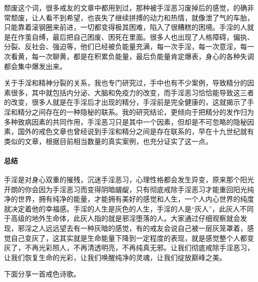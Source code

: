 颓废这个词，很多戒友的文章中都用到过，那种被手淫恶习废掉后的感觉，的确非常颓废，让人看不到希望，也丧失了继续拼搏的动力和热情，就像泄了气的车胎，只能靠着滚钢圈来前进，一切都变得极其困难，陷入了很糟糕的困境。手淫的人就是在作茧自缚，最后把自己困废、困死在里面。很多人也出现了人格障碍，偏执、分裂、反社会、强迫等，他们已经被负能量充满，每一次手淫，每一次意淫，每一次看黄，每一次聊黄，都是在积累负能量，最后负能量肯定爆表，身心的各种失调都会集中爆发出来。

关于手淫和精神分裂的关系，我也专门研究过，手中也有不少案例，导致精分的因素很多，其中就包括内分泌、大脑和免疫力的改变，而手淫恶习恰恰能导致这三者的改变，很多人就是在手淫后才出现的精分，手淫前是完全健康的，这就揭示了手淫和精分之间存在的一种隐秘的联系。我的研究结论，更倾向于把精分的发作归为多种致病因素的共同作用，手淫恶习只是其中一个因素，但却是不可忽略的隐秘因素，国外的戒色文章也曾经说到手淫和精分之间是存在联系的，早在十九世纪就有类似的文章，根据目前相当数量的真实案例，也充分证实了这一点。

\paragraph*{总结}

手淫是对身心双重的摧残，沉迷手淫恶习，心理性格都会发生异变，原来那个阳光开朗的你会因为手淫恶习而变得阴暗龌龊，只有彻底戒除手淫恶习才能重回阳光纯净的世界，拥有纯净的能量，才能拥有美好的感觉和人生，一个人内心世界的纯度就决定着他的幸福感。手淫的人生是灰色的人生，手淫的人是“灰人”，此灰人不同于高级的地外生命体，此灰人指的就是邪淫堕落的人。大家通过仔细观察就会发现，邪淫之人远远望去有一种灰暗的感觉，有的戒友会说自己被一层灰笼罩着，感觉自己变灰了，这其实就是生命能量下降到一定程度的表现，就是感觉整个人都变灰了，不再光彩照人，不再清透明亮，不再纯真无邪。让我们彻底戒除手淫恶习，让我们恢复生命的光彩，让我们唤醒纯净的灵魂，让我们绽放巅峰之美。

下面分享一首戒色诗歌。

